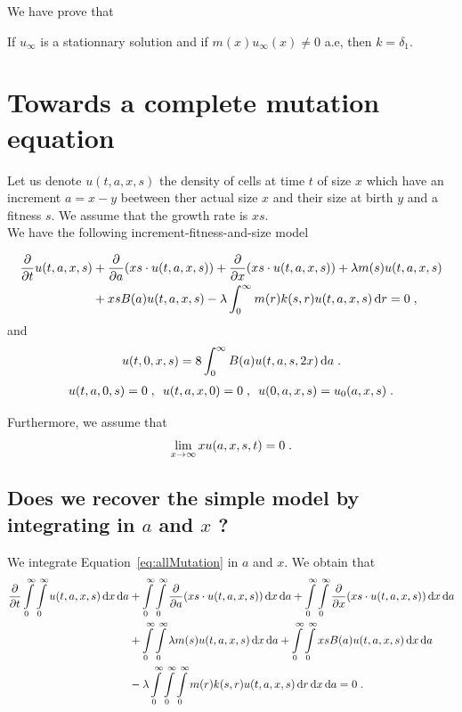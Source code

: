 \documentclass[11pt]{amsart}
\newcommand{\diff}{\,\mathrm{d}}
\begin{document}
We have prove that
\begin{proposition} If $u_\infty$ is a stationnary solution and if $m(x) u_\infty(x) \neq 0$ a.e, then $k = \delta_1$. 
\end{proposition}

\section{Towards a complete mutation equation}

Let us denote $u(t,a,x,s)$ the density of cells at time $t$ of size $x$ which have an increment $a = x-y$ beetween ther actual size $x$ and their size at birth $y$ and a fitness $s$. We assume that the growth rate is $xs$. \\

We have the following increment-fitness-and-size model 

\begin{align}\label{eq:allMutation}
    \partialt u(t,a,x,s) 
    &+ \partiala(xs \cdot u(t,a,x,s)) 
    +  \partialx(xs \cdot u(t,a,x,s)) 
    + \lambda m(s) u(t,a,x,s) \notag\\ 
    &
    + x s B(a) u(t,a,x,s) 
    - \lambda \int_0^\infty m(r) k(s,r) u(t,a,x,s) \diff r = 0  \eqfinv 
\end{align}
and
\begin{align}
    u(t,0,x,s) = 8 \int_0^\infty B(a) u(t,a,s,2x) \diff a
    \eqfinp
\end{align}
\begin{align}
    u(t,a,0,s) = 0
    \; , \enspace
     u(t,a,x,0) = 0
     \; , \enspace
      u(0,a,x,s) = u_0(a,x,s)    \; .
\end{align}

Furthermore, we assume that 
\begin{align*}
    \lim\limits_{x \to \infty} x u(a,x,s,t) = 0
    \; .
\end{align*}

\subsection{Does we recover the simple model by integrating in $a$ and $x$ ?}  
We integrate Equation~\eqref{eq:allMutation} in $a$ and $x$. We obtain that
\begin{align*}
    \partialt \int\limits_0^\infty \int\limits_0^\infty  u(t,a,x,s) \diff x \diff a
    &+ \int\limits_0^\infty \int\limits_0^\infty \partiala(xs \cdot u(t,a,x,s)) \diff x \diff a
    +  \int\limits_0^\infty \int\limits_0^\infty \partialx(xs \cdot u(t,a,x,s)) \diff x \diff a \notag\\ 
    &+ \int\limits_0^\infty \int\limits_0^\infty \lambda m(s) u(t,a,x,s) \diff x \diff a
    +  \int\limits_0^\infty \int\limits_0^\infty x s B(a) u(t,a,x,s) \diff x \diff a \\
    &
    -  \lambda \int\limits_0^\infty \int\limits_0^\infty \int\limits_0^\infty m(r) k(s,r) u(t,a,x,s) \diff r \diff x \diff a = 0
    \eqfinp
\end{align*}
\end{document}
